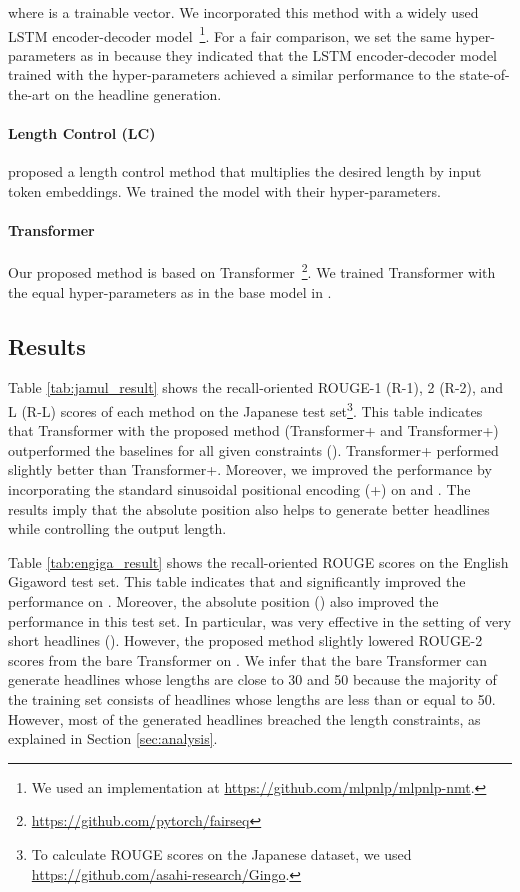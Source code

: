 \documentclass[11pt,a4paper]{article}
\begin{document}
where  is a trainable vector.
We incorporated this method with a widely used LSTM encoder-decoder model~\cite{luong-pham-manning:2015:EMNLP}\footnote{We used an implementation at \href{https://github.com/mlpnlp/mlpnlp-nmt}{https://github.com/mlpnlp/mlpnlp-nmt}.}.
For a fair comparison, we set the same hyper-parameters as in  because they indicated that the LSTM encoder-decoder model trained with the hyper-parameters achieved a similar performance to the state-of-the-art on the headline generation.

\paragraph{Length Control (LC)}
 proposed a length control method that multiplies the desired length by input token embeddings.
We trained the model with their hyper-parameters.

\paragraph{Transformer}
Our proposed method is based on Transformer~\cite{NIPS2017_7181}\footnote{\href{https://github.com/pytorch/fairseq}{https://github.com/pytorch/fairseq}}.
We trained Transformer with the equal hyper-parameters as in the base model in .

\subsection{Results}
Table \ref{tab:jamul_result} shows the recall-oriented ROUGE-1 (R-1), 2 (R-2), and L (R-L) scores of each method on the Japanese test set\footnote{To calculate ROUGE scores on the Japanese dataset, we used \href{https://github.com/asahi-research/Gingo}{https://github.com/asahi-research/Gingo}.}.
This table indicates that Transformer with the proposed method (Transformer+ and Transformer+) outperformed the baselines for all given constraints ().
Transformer+ performed slightly better than Transformer+.
Moreover, we improved the performance by incorporating the standard sinusoidal positional encoding (+) on  and .
The results imply that the absolute position also helps to generate better headlines while controlling the output length.



Table \ref{tab:engiga_result} shows the recall-oriented ROUGE scores on the English Gigaword test set.
This table indicates that  and  significantly improved the performance on .
Moreover, the absolute position () also improved the performance in this test set.
In particular,  was very effective in the setting of very short headlines ().
However, the proposed method slightly lowered ROUGE-2 scores from the bare Transformer on .
We infer that the bare Transformer can generate headlines whose lengths are close to 30 and 50 because the majority of the training set consists of headlines whose lengths are less than or equal to 50.
However, most of the generated headlines breached the length constraints, as explained in Section \ref{sec:analysis}.
\end{document}
